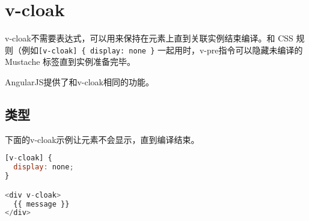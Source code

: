 \begin{lstlisting}[language=JavaScript]

\end{lstlisting}




\begin{lstlisting}[language=JavaScript]

\end{lstlisting}

\section{v-cloak}

v-cloak不需要表达式，可以用来保持在元素上直到关联实例结束编译。和 CSS 规则（例如\texttt{[v-cloak] \{ display: none \}} 一起用时，v-pre指令可以隐藏未编译的 Mustache 标签直到实例准备完毕。

AngularJS提供了和v-cloak相同的功能。

\subsection{类型}

下面的v-cloak示例让元素不会显示，直到编译结束。

\begin{lstlisting}[language=JavaScript]
[v-cloak] {
  display: none;
}

<div v-cloak>
  {{ message }}
</div>
\end{lstlisting}



\begin{lstlisting}[language=JavaScript]

\end{lstlisting}




\begin{lstlisting}[language=JavaScript]

\end{lstlisting}




\begin{lstlisting}[language=JavaScript]

\end{lstlisting}




\begin{lstlisting}[language=JavaScript]

\end{lstlisting}




